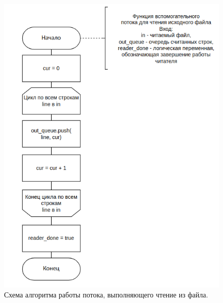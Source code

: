 \clearpage

\begin{figure}[h]
	\centering
	\includegraphics[height=0.8\textheight]{img/thread_reader.png}
	\caption{Схема алгоритма работы потока, выполняющего чтение из файла.}
	\label{fig:thread_reader}
\end{figure}

\clearpage

